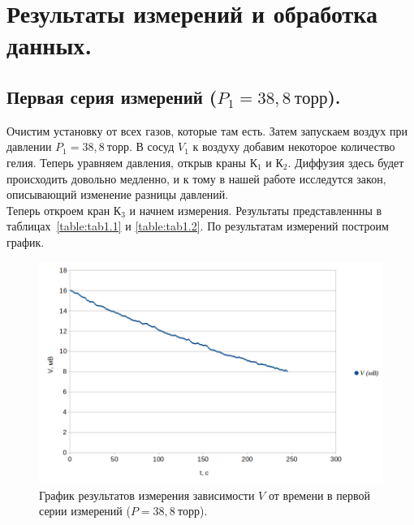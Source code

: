 \documentclass[a4paper,11pt]{article}
\begin{document}
\section{Результаты измерений и обработка данных.}
\subsection{Первая серия измерений ($P_{1} = 38,8\ торр$).}
Очистим установку от всех газов, которые там есть. Затем запускаем воздух при давлении $P_{1} = 38,8\ торр$. В сосуд $V_{1}$ к воздуху добавим некоторое количество гелия. Теперь уравняем давления, открыв краны К$_{1}$ и К$_{2}$. Диффузия здесь будет происходить довольно медленно, и к тому в нашей работе исследутся закон, описывающий изменение разницы давлений.\\
Теперь откроем кран К$_{3}$ и начнем измерения. Результаты представленнны в таблицах~\ref{table:tab1.1} и \ref{table:tab1.2}.
По результатам измерений построим график.
\begin{figure}[h!]\label{fig:img3}
  \centering
  \includegraphics[scale = 0.4125]{graph1.png}
  \caption{График результатов измерения зависимости $V$ от времени в первой серии измерений ($P = 38,8\ торр$).}
\end{figure}
\end{document}
